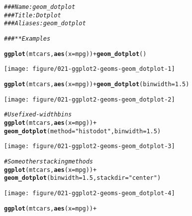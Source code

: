 \documentclass[a4paper,titlepage]{tufte-handout}\usepackage[]{graphicx}\usepackage[]{color}
\makeatletter
\def\maxwidth{ %
  \ifdim\Gin@nat@width>\linewidth
    \linewidth
  \else
    \Gin@nat@width
  \fi
}
\newcommand{\hlnum}[1]{\textcolor[rgb]{0.686,0.059,0.569}{#1}}%
\newcommand{\hlstr}[1]{\textcolor[rgb]{0.192,0.494,0.8}{#1}}%
\newcommand{\hlcom}[1]{\textcolor[rgb]{0.678,0.584,0.686}{\textit{#1}}}%
\newcommand{\hlopt}[1]{\textcolor[rgb]{0,0,0}{#1}}%
\newcommand{\hlstd}[1]{\textcolor[rgb]{0.345,0.345,0.345}{#1}}%
\newcommand{\hlkwc}[1]{\textcolor[rgb]{0.333,0.667,0.333}{#1}}%
\newcommand{\hlkwd}[1]{\textcolor[rgb]{0.737,0.353,0.396}{\textbf{#1}}}%
\newenvironment{kframe}{%
 \def\at@end@of@kframe{}%
 \ifinner\ifhmode%
  \def\at@end@of@kframe{\end{minipage}}%
  \begin{minipage}{\columnwidth}%
 \fi\fi%
 \def\FrameCommand##1{\hskip\@totalleftmargin \hskip-\fboxsep
 \colorbox{shadecolor}{##1}\hskip-\fboxsep
     \hskip-\linewidth \hskip-\@totalleftmargin \hskip\columnwidth}%
 \MakeFramed {\advance\hsize-\width
   \@totalleftmargin\z@ \linewidth\hsize
   \@setminipage}}%
 {\par\unskip\endMakeFramed%
 \at@end@of@kframe}
\newenvironment{knitrout}{}{} %
\makeatother
\begin{document}
\begin{knitrout}
\color{fgcolor}\begin{kframe}
\begin{alltt}
\hlcom{### Name: geom_dotplot}
\hlcom{### Title: Dot plot}
\hlcom{### Aliases: geom_dotplot}

\hlcom{### ** Examples}

\hlkwd{ggplot}\hlstd{(mtcars,} \hlkwd{aes}\hlstd{(}\hlkwc{x} \hlstd{= mpg))} \hlopt{+} \hlkwd{geom_dotplot}\hlstd{()}
\end{alltt}


{\ttfamily\noindent\itshape\color{messagecolor}{\#\# `stat\_bindot()` using `bins = 30`. Pick better value with `binwidth`.}}\end{kframe}
\texttt{[image: figure/021-ggplot2-geoms-geom\_dotplot-1]} 
\begin{kframe}\begin{alltt}
\hlkwd{ggplot}\hlstd{(mtcars,} \hlkwd{aes}\hlstd{(}\hlkwc{x} \hlstd{= mpg))} \hlopt{+} \hlkwd{geom_dotplot}\hlstd{(}\hlkwc{binwidth} \hlstd{=} \hlnum{1.5}\hlstd{)}
\end{alltt}
\end{kframe}
\texttt{[image: figure/021-ggplot2-geoms-geom\_dotplot-2]} 
\begin{kframe}\begin{alltt}
\hlcom{# Use fixed-width bins}
\hlkwd{ggplot}\hlstd{(mtcars,} \hlkwd{aes}\hlstd{(}\hlkwc{x} \hlstd{= mpg))} \hlopt{+}
  \hlkwd{geom_dotplot}\hlstd{(}\hlkwc{method}\hlstd{=}\hlstr{"histodot"}\hlstd{,} \hlkwc{binwidth} \hlstd{=} \hlnum{1.5}\hlstd{)}
\end{alltt}
\end{kframe}
\texttt{[image: figure/021-ggplot2-geoms-geom\_dotplot-3]} 
\begin{kframe}\begin{alltt}
\hlcom{# Some other stacking methods}
\hlkwd{ggplot}\hlstd{(mtcars,} \hlkwd{aes}\hlstd{(}\hlkwc{x} \hlstd{= mpg))} \hlopt{+}
  \hlkwd{geom_dotplot}\hlstd{(}\hlkwc{binwidth} \hlstd{=} \hlnum{1.5}\hlstd{,} \hlkwc{stackdir} \hlstd{=} \hlstr{"center"}\hlstd{)}
\end{alltt}
\end{kframe}
\texttt{[image: figure/021-ggplot2-geoms-geom\_dotplot-4]} 
\begin{kframe}\begin{alltt}
\hlkwd{ggplot}\hlstd{(mtcars,} \hlkwd{aes}\hlstd{(}\hlkwc{x} \hlstd{= mpg))} \hlopt{+}

\end{alltt}
\end{kframe}
\end{knitrout}
\end{document}
